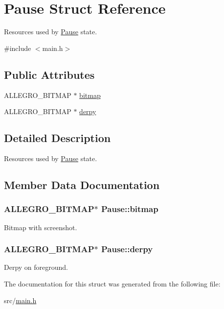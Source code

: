 \hypertarget{structPause}{\section{\-Pause \-Struct \-Reference}
\label{structPause}
}


\-Resources used by \hyperlink{structPause}{\-Pause} state.  




{\ttfamily \#include $<$main.\-h$>$}

\subsection*{\-Public \-Attributes}
\begin{DoxyCompactItemize}
\item 
\-A\-L\-L\-E\-G\-R\-O\-\_\-\-B\-I\-T\-M\-A\-P $\ast$ \hyperlink{structPause_a50c6c3e5d72008c50ae7e3aba1c794d1}{bitmap}
\item 
\-A\-L\-L\-E\-G\-R\-O\-\_\-\-B\-I\-T\-M\-A\-P $\ast$ \hyperlink{structPause_aa2a1cde9971149a5c48f10899ca97079}{derpy}
\end{DoxyCompactItemize}


\subsection{\-Detailed \-Description}
\-Resources used by \hyperlink{structPause}{\-Pause} state. 

\subsection{\-Member \-Data \-Documentation}
\hypertarget{structPause_a50c6c3e5d72008c50ae7e3aba1c794d1}{
\subsubsection[{bitmap}]{\setlength{\rightskip}{0pt plus 5cm}\-A\-L\-L\-E\-G\-R\-O\-\_\-\-B\-I\-T\-M\-A\-P$\ast$ {\bf \-Pause\-::bitmap}}}\label{structPause_a50c6c3e5d72008c50ae7e3aba1c794d1}
\-Bitmap with screenshot. \hypertarget{structPause_aa2a1cde9971149a5c48f10899ca97079}{
\subsubsection[{derpy}]{\setlength{\rightskip}{0pt plus 5cm}\-A\-L\-L\-E\-G\-R\-O\-\_\-\-B\-I\-T\-M\-A\-P$\ast$ {\bf \-Pause\-::derpy}}}\label{structPause_aa2a1cde9971149a5c48f10899ca97079}
\-Derpy on foreground. 

\-The documentation for this struct was generated from the following file\-:\begin{DoxyCompactItemize}
\item 
src/\hyperlink{main_8h}{main.\-h}\end{DoxyCompactItemize}
